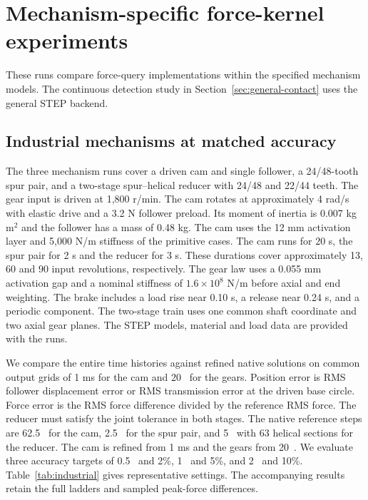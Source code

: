 \section{Mechanism-specific force-kernel experiments}
These runs compare force-query implementations within the specified mechanism models. The continuous detection study in Section~\ref{sec:general-contact} uses the general STEP backend.

\subsection{Industrial mechanisms at matched accuracy}
\label{sec:industrial}
The three mechanism runs cover a driven cam and single follower, a 24/48-tooth spur pair, and a two-stage spur--helical reducer with 24/48 and 22/44 teeth. The gear input is driven at 1,800 r/min. The cam rotates at approximately 4 rad/s with elastic drive and a 3.2 N follower preload. Its moment of inertia is 0.007 kg\,m$^2$ and the follower has a mass of 0.48 kg. The cam uses the 12 mm activation layer and 5,000 N/m stiffness of the primitive cases. The cam runs for 20 s, the spur pair for 2 s and the reducer for 3 s. These durations cover approximately 13, 60 and 90 input revolutions, respectively. The gear law uses a 0.055 mm activation gap and a nominal stiffness of $1.6\times10^8$ N/m before axial and end weighting. The brake includes a load rise near 0.10 s, a release near 0.24 s, and a periodic component. The two-stage train uses one common shaft coordinate and two axial gear planes. The STEP models, material and load data are provided with the runs.

We compare the entire time histories against refined native solutions on common output grids of 1 ms for the cam and 20~\microsec{} for the gears. Position error is RMS follower displacement error or RMS transmission error at the driven base circle. Force error is the RMS force difference divided by the reference RMS force. The reducer must satisfy the joint tolerance in both stages. The native reference steps are 62.5~\microsec{} for the cam, 2.5~\microsec{} for the spur pair, and 5~\microsec{} with 63 helical sections for the reducer. The cam is refined from 1 ms and the gears from 20~\microsec{}. We evaluate three accuracy targets of 0.5~\micron{} and 2\%, 1~\micron{} and 5\%, and 2~\micron{} and 10\%. Table~\ref{tab:industrial} gives representative settings. The accompanying results retain the full ladders and sampled peak-force differences.


